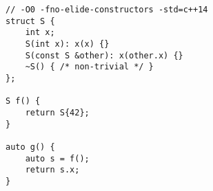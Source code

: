\begin{lstlisting}[title=\href{https://godbolt.org/z/1D6cL0}{\texttt{godbolt.org/z/1D6cL0}}]
// -O0 -fno-elide-constructors -std=c++14 
struct S {
    int x;
    S(int x): x(x) {}
    S(const S &other): x(other.x) {}
    ~S() { /* non-trivial */ }
};

S f() {
    return S{42};
}

auto g() {
    auto s = f();
    return s.x;
}
\end{lstlisting}
